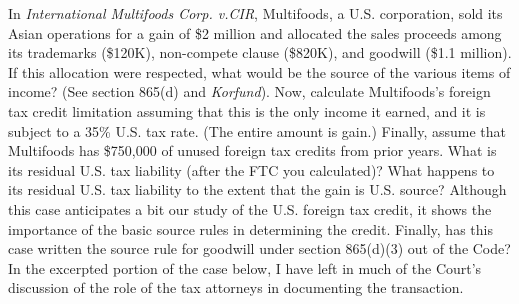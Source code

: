 In \emph{International Multifoods Corp. v.\@ CIR}, Multifoods, a U.S. corporation, sold its Asian operations for a gain of \$2 million and allocated the sales proceeds among its trademarks (\$120K), non-compete clause (\$820K), and goodwill (\$1.1 million).  If this allocation were respected, what would be the source of the various items of income?  (See section 865(d) and \emph{Korfund}).  Now, calculate Multifoods's foreign tax credit limitation assuming that this is the only income it earned, and it is subject to a 35\% U.S. tax rate.  (The entire amount is gain.)  Finally, assume that Multifoods has \$750,000 of unused foreign tax credits from prior years.  What is its residual U.S. tax liability (after the FTC you calculated)?  What happens to its residual U.S. tax liability to the extent that the gain is U.S. source?  Although this case anticipates a bit our study of the U.S. foreign tax credit, it shows the importance of the basic source rules in determining the credit.  Finally, has this case written the source rule for goodwill under section 865(d)(3) out of the Code?  In the excerpted portion of the case below, I have left in much of the Court's discussion of the role of the tax attorneys in documenting the transaction. 

